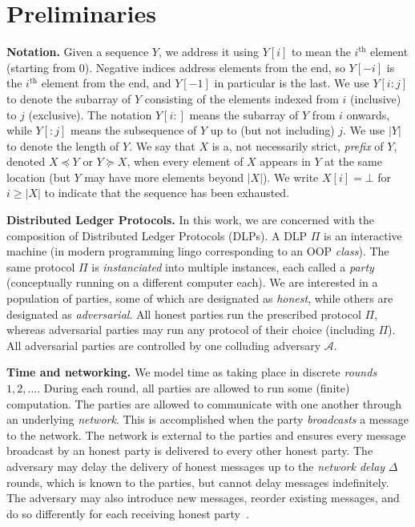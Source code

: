 \section{Preliminaries}

\noindent
\textbf{Notation.}
Given a sequence $Y$, we address it using $Y[i]$ to mean the $i^\text{th}$ element (starting from $0$).
Negative indices address elements from the end, so $Y[-i]$ is the $i^\text{th}$ element from
the end, and $Y[-1]$ in particular is the last. We use $Y[i{:}j]$ to denote the subarray of $Y$
consisting of the elements indexed from $i$ (inclusive) to $j$ (exclusive). The notation $Y[i{:}]$ means the
subarray of $Y$ from $i$ onwards, while $Y[{:}j]$ means the subsequence of $Y$ up to (but not including) $j$.
We use $|Y|$ to denote the length of $Y$.
We say that $X$ is a, not necessarily strict,
\emph{prefix} of $Y$, denoted $X \preceq Y$
or $Y \succeq X$,
when every element of $X$ appears in $Y$ at the
same location (but $Y$ may have more elements beyond $|X|$).
We write $X[i] = \bot$ for $i \geq |X|$ to indicate that the sequence
has been exhausted.

\noindent
\textbf{Distributed Ledger Protocols.}
In this work, we are concerned with the composition of Distributed Ledger
Protocols (DLPs). A DLP $\Pi$ is an interactive machine (in modern programming
lingo corresponding to an OOP \emph{class}). The same
protocol $\Pi$ is \emph{instanciated} into multiple instances,
each called a \emph{party} (conceptually running on a different computer each).
We are interested in a population of parties, some of which are designated
as \emph{honest}, while others are designated as \emph{adversarial}.
All honest parties run the prescribed protocol $\Pi$, whereas adversarial
parties may run any protocol of their choice (including $\Pi$).
All adversarial parties are controlled by one colluding adversary $\mathcal{A}$.

\noindent
\textbf{Time and networking.}
We model time as taking place in discrete \emph{rounds} $1, 2, \ldots$.
During each round, all parties are allowed to run some (finite) computation.
The parties are allowed to communicate with one another through an
underlying \emph{network}. This is accomplished when the party \emph{broadcasts}
a message to the network. The network is external to the parties and ensures
every message broadcast by an honest party is delivered to every other honest
party. The adversary may delay the delivery of honest messages up to the
\emph{network delay} $\Delta$ rounds, which is known to the parties, but cannot delay
messages indefinitely. The adversary may also introduce new messages, reorder
existing messages, and do so differently for each receiving honest
party~\cite{backbone}.

